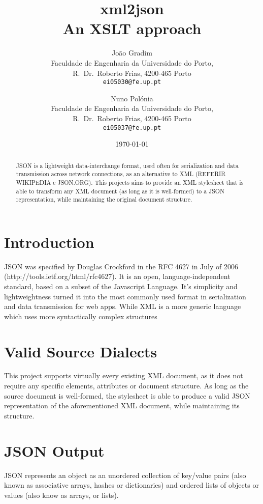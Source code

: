 \documentclass[twocolumn,twoside,10pt,a4paper]{article}
\title{xml2json\\\footnotesize{An XSLT approach}}
\author{João Gradim\\
\small Faculdade de Engenharia da Universidade do Porto,\\[-0.8ex]
\small R.\ Dr.\ Roberto Frias, 4200-465 Porto\\[-0.8ex]
\small \texttt{ei05030@fe.up.pt}\\
\and
Nuno Polónia\\
\small Faculdade de Engenharia da Universidade do Porto,\\[-0.8ex]
\small R.\ Dr.\ Roberto Frias, 4200-465 Porto\\[-0.8ex]
\small \texttt{ei05037@fe.up.pt}
}
\date{\today}
\begin{document}
\maketitle
\thispagestyle{plain}

\begin{abstract}

JSON is a lightweight data-interchange format, used often for serialization and data transmission across network connections, as an alternative to XML (REFERIR WIKIPEDIA e JSON.ORG). This projects aims to provide an XML stylesheet that is able to transform any XML document (as long as it is well-formed) to a JSON representation, while maintaining the original document structure.

\end{abstract}

\section{Introduction}\label{sec:intro}

JSON was specified by Douglas Crockford in the RFC 4627 in July of 2006\cite{rfc4627} (http://tools.ietf.org/html/rfc4627). It is an open, language-independent standard, based on a subset of the Javascript Language.
It's simplicity and lightweightness turned it into the most commonly used format in serialization and data transmission for web apps. While XML is a more generic language which uses more syntactically complex structures  

\section{Valid Source Dialects}\label{sec:valid-source-dialects}

This project supports virtually every existing XML document, as it does not require any specific elements, attributes or document structure. As long as the source document is well-formed, the stylesheet is able to produce a valid JSON representation of the aforementioned XML document, while maintaining its structure.
 
\section{JSON Output}\label{sec:json-output}

JSON represents an object as an unordered collection of key/value pairs (also known as associative arrays, hashes or dictionaries) and ordered lists of objects or values (also know as arrays, or lists).
\end{document}
